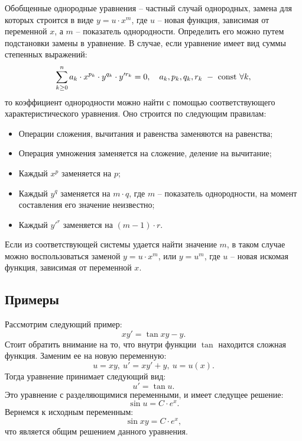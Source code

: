 	Обобщенные однородные уравнения -- частный случай однородных, замена для которых строится в виде $y = u \cdot x^m$, где $u$ -- новая функция, зависимая от переменной $x$, а $m$ -- показатель однородности. Определить его можно путем подстановки замены в уравнение. В случае, если уравнение имеет вид суммы степенных выражений:
	\[ \sum_{k \ge 0}^n a_k \cdot x^{p_k} \cdot y^{q_k} \cdot y'^{r_k} = 0, \quad a_k, p_k, q_k, r_k ~ - ~ \mathrm{const} ~ \forall k, \]
	то коэффициент однородности можно найти с помощью соответствующего характеристического уравнения. Оно строится по следующим правилам:
	\begin{itemize}
		\item Операции сложения, вычитания и равенства заменяются на равенства;
		\item Операция умножения заменяется на сложение, деление на вычитание;
		\item Каждый $x^p$ заменяется на $p$;
		\item Каждый $y^q$ заменяется на $m \cdot q$, где $m$ -- показатель однородности, на момент составления его значение неизвестно;
		\item Каждый $y'^{r}$ заменяется на $(m - 1) \cdot r$.
	\end{itemize}
	Если из соответствующей системы удается найти значение $m$, в таком случае можно воспользоваться заменой $y = u \cdot x^m$, или $y = u^m$, где $u$ -- новая искомая функция, зависимая от переменной $x$.

	\subsection{Примеры}

		Рассмотрим следующий пример:
		\[ xy' = \tan{xy} - y. \]
		Стоит обратить внимание на то, что внутри функции $\tan$ находится сложная функция. Заменим ее на новую переменную:
		\[ u = xy, ~ u' = xy' + y, ~ u = u(x). \]
		Тогда уравнение принимает следующий вид:
		\[ u' = \tan{u}. \]
		Это уравнение с разделяющимися переменными, и имеет следущее решение:
		\[ \sin{u} = C \cdot e^{x}. \]
		Вернемся к исходным переменным:
		\[ \sin{xy} = C \cdot e^{x}, \]
		что является общим решением данного уравнения.

